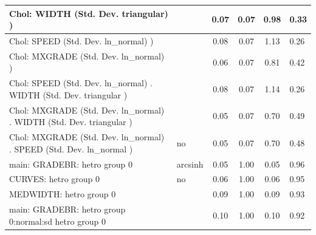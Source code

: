 \begin{table}
\begin{center}
\begin{tabular}{|l|l|c|c|c|l|}
			\hline
			 Chol: WIDTH (Std. Dev. triangular) ) &  & 0.07 & 0.07 & 0.98 & 0.33 \\
			\hline
			 Chol: SPEED (Std. Dev. ln_normal) ) &  & 0.08 & 0.07 & 1.13 & 0.26 \\
			\hline
			 Chol: MXGRADE (Std. Dev. ln_normal) ) &  & 0.06 & 0.07 & 0.81 & 0.42 \\
			\hline
			 Chol: SPEED (Std. Dev. ln_normal) . WIDTH (Std. Dev.   triangular ) &  & 0.08 & 0.07 & 1.14 & 0.26 \\
			\hline
			 Chol: MXGRADE (Std. Dev. ln_normal) . WIDTH (Std. Dev.   triangular ) &  & 0.05 & 0.07 & 0.70 & 0.49 \\
			\hline
			 Chol: MXGRADE (Std. Dev. ln_normal) . SPEED (Std. Dev.   ln_normal ) & no & 0.05 & 0.07 & 0.70 & 0.48 \\
			\hline
			main: GRADEBR: hetro group 0 & arcsinh & 0.05 & 1.00 & 0.05 & 0.96 \\
			\hline
			CURVES: hetro group 0 & no & 0.06 & 1.00 & 0.06 & 0.95 \\
			\hline
			MEDWIDTH: hetro group 0 &  & 0.09 & 1.00 & 0.09 & 0.93 \\
			\hline
			main: GRADEBR: hetro group 0:normal:sd  hetro group 0 &  & 0.10 & 1.00 & 0.10 & 0.92 \\
			\hline
		\end{tabular}
	\end{center}
\end{table}